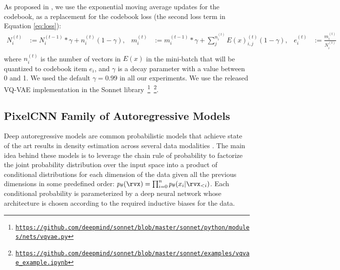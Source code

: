 As proposed in \cite{VQVAE}, we use the exponential moving average updates for the codebook, as a replacement for the codebook loss (the second loss term in Equation \eqref{eq:loss}):
\begin{equation*}
\begin{aligned}
N^{(t)}_i &:= N^{(t-1)}_i * \gamma + n^{(t)}_i (1 - \gamma), &
m^{(t)}_i &:= m^{(t-1)}_i * \gamma + \sum_j^{n^{(t)}_i} E(x)^{(t)}_{i,j} (1 - \gamma), &
e^{(t)}_i &:= \frac{m^{(t)}_i}{N^{(t)}_i} \\ 
\end{aligned}
\label{ema}
\end{equation*}
where $n^{(t)}_i$ is the number of vectors in $E(x)$ in the mini-batch that will be quantized to codebook item $e_i$, and $\gamma$ is a decay parameter with a value between 0 and 1. We used the default $\gamma=0.99$ in all our experiments. We use the released VQ-VAE implementation in the Sonnet library~\footnote{\texttt{\scriptsize{\url{https://github.com/deepmind/sonnet/blob/master/sonnet/python/modules/nets/vqvae.py}}}}~\footnote{\texttt{\scriptsize{\url{https://github.com/deepmind/sonnet/blob/master/sonnet/examples/vqvae\_example.ipynb}}}}.

\subsection{PixelCNN Family of Autoregressive Models}
Deep autoregressive models are common probabilistic models that achieve state of the art results in density estimation across several data modalities \cite{gpt2, PixelSnail, ImageTransformer, oord2016wavenet}. The main idea behind these models is to leverage the chain rule of probability to factorize the joint probability distribution over the input space into a product of conditional distributions for each dimension of the data given all the previous dimensions in some predefined order: $p_\theta(\rvx) = \prod_{i=0}^{n} p_\theta(x_i|\rvx_{<i})$. Each conditional probability is parameterized by a deep neural network whose architecture is chosen according to the required inductive biases for the data.
